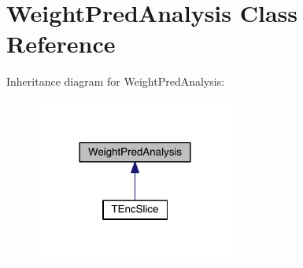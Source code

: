 \hypertarget{class_weight_pred_analysis}{}\section{Weight\+Pred\+Analysis Class Reference}
\label{class_weight_pred_analysis}


Inheritance diagram for Weight\+Pred\+Analysis\+:
\nopagebreak
\begin{figure}[H]
\begin{center}
\leavevmode
\includegraphics[width=185pt]{d6/d1e/class_weight_pred_analysis__inherit__graph}
\end{center}
\end{figure}
